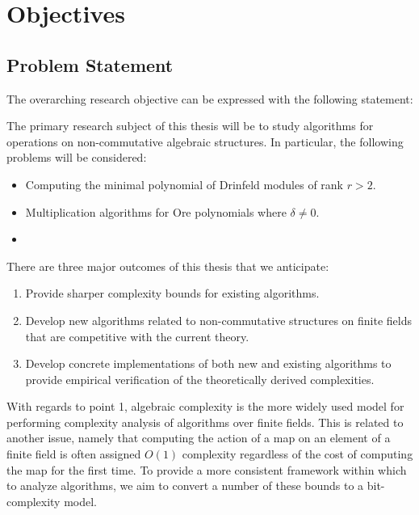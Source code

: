 \chapter{Objectives} \label{ch-2}

\section{Problem Statement}

The overarching research objective can be expressed with the following statement:

\begin{statement*}
The primary research subject of this thesis will be to study algorithms for operations on non-commutative algebraic structures. In particular, the following problems will be considered:

\begin{itemize}
    \item Computing the minimal polynomial of Drinfeld modules of rank $r > 2$.
    \item Multiplication algorithms for Ore polynomials where $\delta \neq 0$.
    \item 
\end{itemize}

\end{statement*}

There are three major outcomes of this thesis that we anticipate:

\begin{enumerate}
    \item Provide sharper complexity bounds for existing algorithms.

    \item Develop new algorithms related to non-commutative structures on finite fields that are competitive with the current theory.
    
    
    \item Develop concrete implementations of both new and existing algorithms to provide empirical verification of the theoretically derived complexities.
\end{enumerate}

With regards to point 1, algebraic complexity is the more widely used model for performing complexity analysis of algorithms over finite fields. This is related to another issue, namely that computing the action of a map on an element of a finite field is often assigned $O(1)$ complexity regardless of the cost of computing the map for the first time. To provide a more consistent framework within which to analyze algorithms, we aim to convert a number of these bounds to a bit-complexity model.



